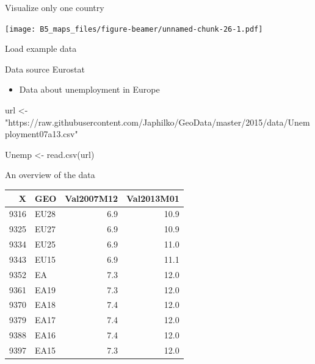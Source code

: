 \documentclass[
  10pt,
  ignorenonframetext,
]{beamer}
\newenvironment{Shaded}{\begin{snugshade}}{\end{snugshade}}
\newcommand{\KeywordTok}[1]{\textcolor[rgb]{0.94,0.87,0.69}{#1}}
\newcommand{\NormalTok}[1]{\textcolor[rgb]{0.80,0.80,0.80}{#1}}
\newcommand{\OperatorTok}[1]{\textcolor[rgb]{0.94,0.94,0.82}{#1}}
\newcommand{\StringTok}[1]{\textcolor[rgb]{0.80,0.58,0.58}{#1}}
\providecommand{\tightlist}{%
  \setlength{\itemsep}{0pt}\setlength{\parskip}{0pt}}
\begin{document}
\begin{frame}[fragile]{Visualize only one country}
\protect\hypertarget{visualize-only-one-country}{}

\begin{Shaded}
\end{Shaded}

\texttt{[image: B5\_maps\_files/figure-beamer/unnamed-chunk-26-1.pdf]}

\end{frame}

\begin{frame}[fragile]{Load example data}
\protect\hypertarget{load-example-data}{}

\begin{block}{Data source Eurostat}

\begin{itemize}
\tightlist
\item
  Data about unemployment in Europe
\end{itemize}

\begin{Shaded}
\begin{Highlighting}[]
\NormalTok{url <-}\StringTok{ "https://raw.githubusercontent.com/Japhilko/GeoData/master/2015/data/Unemployment07a13.csv"}

\NormalTok{Unemp <-}\StringTok{ }\KeywordTok{read.csv}\NormalTok{(url) }
\end{Highlighting}
\end{Shaded}

\end{block}

\end{frame}

\begin{frame}{An overview of the data}
\protect\hypertarget{an-overview-of-the-data}{}

\begin{longtable}[]{@{}rlrr@{}}
\toprule
X & GEO & Val2007M12 & Val2013M01\tabularnewline
\midrule
\endhead
9316 & EU28 & 6.9 & 10.9\tabularnewline
9325 & EU27 & 6.9 & 10.9\tabularnewline
9334 & EU25 & 6.9 & 11.0\tabularnewline
9343 & EU15 & 6.9 & 11.1\tabularnewline
9352 & EA & 7.3 & 12.0\tabularnewline
9361 & EA19 & 7.3 & 12.0\tabularnewline
9370 & EA18 & 7.4 & 12.0\tabularnewline
9379 & EA17 & 7.4 & 12.0\tabularnewline
9388 & EA16 & 7.4 & 12.0\tabularnewline
9397 & EA15 & 7.3 & 12.0\tabularnewline
\bottomrule
\end{longtable}

\end{frame}
\end{document}
